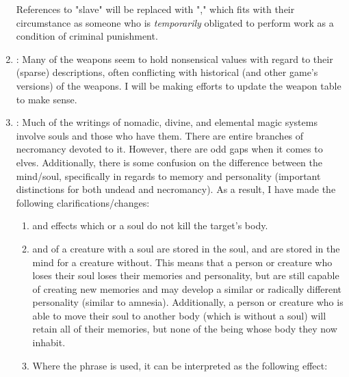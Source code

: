 \begin{enumerate}[leftmargin=12pt]
References to "slave" will be replaced with "," which fits with their circumstance as someone who is \textit{temporarily} obligated to perform work as a condition of criminal punishment. 
\item {}: Many of the weapons seem to hold nonsensical values with regard to their (sparse) descriptions, often conflicting with historical (and other game's versions) of the weapons. I will be making efforts to update the weapon table to make sense.
\item {}: Much of the writings of nomadic, divine, and elemental magic systems involve souls and those who have them. There are entire branches of necromancy devoted to it. However, there are odd gaps when it comes to elves. Additionally, there is some confusion on the difference between the mind/soul, specifically in regards to memory and personality (important distinctions for both undead and necromancy). As a result, I have made the following clarifications/changes:
\begin{enumerate}
	\item {} and effects which  or  a soul do not kill the target's body.
	\item {} and  of a creature with a soul are stored in the soul, and are stored in the mind for a creature without. This means that a person or creature who loses their soul loses their memories and personality, but are still capable of creating new memories and may develop a similar or radically different personality (similar to amnesia). Additionally, a person or creature who is able to move their soul to another body (which is without a soul) will retain all of their memories, but none of the being whose body they now inhabit.
	\item Where the phrase  is used, it can be interpreted as the following effect:


\end{enumerate}
\end{enumerate}
